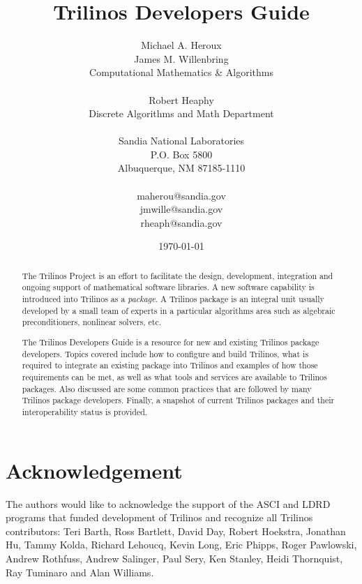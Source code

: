 \documentclass[12pt,relax]{TrilinosDevGuide}
\title{Trilinos Developers Guide}
\author{
Michael A. Heroux \\
James M. Willenbring\\
Computational Mathematics \& Algorithms \\
 \\
Robert Heaphy \\
Discrete Algorithms and Math Department \\
 \\
Sandia National Laboratories\\
P.O. Box 5800\\
Albuquerque, NM 87185-1110 \\
 \\
maherou@sandia.gov \\
jmwille@sandia.gov \\
rheaph@sandia.gov \\
}
\date{\today} %
\begin{document}
\maketitle
\setcounter{page}{3} %
\begin{abstract}

The Trilinos Project is an effort to facilitate the design, development,
integration and ongoing support of mathematical software libraries.
A new software capability is introduced into Trilinos as a {\it
package}.  A Trilinos package is an integral unit usually developed by
a small team of experts in a particular algorithms area such as
algebraic preconditioners, nonlinear solvers, etc.

The Trilinos Developers Guide is a resource for new and existing
Trilinos package developers.  Topics covered include how to configure and 
build Trilinos, what is required to integrate an existing package into Trilinos
and examples of how those requirements can be met, as well as what
tools and services are 
available to Trilinos packages.  Also discussed are some common practices that 
are followed by many Trilinos package developers.  Finally, a snapshot
of current Trilinos packages and their interoperability status
is provided.

\end{abstract}


\section*{Acknowledgement}
The authors would like to acknowledge the support of the ASCI and LDRD 
programs that funded development of Trilinos and recognize all Trilinos 
contributors: Teri Barth, Ross Bartlett, David Day, Robert Hoekstra, 
Jonathan Hu, Tammy Kolda, Richard Lehoucq, Kevin Long, Eric Phipps, 
Roger Pawlowski, Andrew Rothfuss, Andrew Salinger, Paul Sery, Ken
Stanley, Heidi Thornquist, Ray Tuminaro and Alan Williams.

\clearpage
\tableofcontents
\listoffigures
\listoftables

\clearpage
\end{document}
